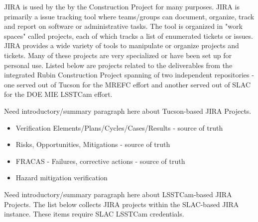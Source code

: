 JIRA is used by the by the Construction Project for many purposes.  JIRA is primarily a issue tracking tool where teams/groups can document, organize, track and report on software or administrative tasks. \citep{JIRA-cite} The tool is organized in "work spaces" called projects, each of which tracks a list of enumerated tickets or issues. JIRA provides a wide variety of tools to manipulate or organize projects and tickets. Many of these projects are very specialized or have been set up for personal use.  Listed below are projects related to the deliverables from the integrated Rubin Construction Project spanning of two independent repositories - one served out of Tucson for the MREFC effort and another served out of SLAC for the DOE MIE LSSTCam effort.

Need introductory/summary paragraph here about Tucson-based JIRA Projects.

\begin{itemize}
	\item Verification Elements/Plans/Cycles/Cases/Results - source of truth
	\item Risks, Opportunities, Mitigations - source of truth
	\item FRACAS - Failures, corrective actions - source of truth
	\item Hazard mitigation verification
\end{itemize}

Need introductory/summary paragraph here about LSSTCam-based JIRA Projects.
The list below collects JIRA projects within the SLAC-based JIRA instance. These items require SLAC LSSTCam credentials.

